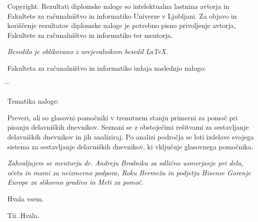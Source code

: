 \documentclass[a4paper, 12pt]{book}
\newcommand{\clearemptydoublepage}{\newpage{\pagestyle{empty}\cleardoublepage}}
\begin{document}
\noindent
{\sc Copyright}. 
Rezultati diplomske naloge so intelektualna lastnina avtorja in Fakultete za računalništvo in informatiko Univerze v Ljubljani.
Za objavo in koriščenje rezultatov diplomske naloge je potrebno pisno privoljenje avtorja, Fakultete za računalništvo in informatiko ter mentorja.

\begin{center}
\mbox{}\vfill
\emph{Besedilo je oblikovano z urejevalnikom besedil \LaTeX.}
\end{center}
\clearemptydoublepage

\thispagestyle{empty}
\vspace*{4cm}

\noindent
Fakulteta za računalništvo in informatiko izdaja naslednjo nalogo:
\medskip
\begin{tabbing}
\hspace{32mm}\= \hspace{6cm} \= \kill




Tematika naloge:
\end{tabbing}
Preveri, ali so glasovni pomočniki v trenutnem stanju primerni za pomoč pri pisanju delavniških dnevnikov.
Seznani se z obstoječimi rešitvami za sestavljanje delavniških dnevnikov in jih analiziraj.
Po analizi področja se loti izdelave svojega sistema za sestavljanje delavniških dnevnikov, ki vključuje glasovnega pomočnika.
\vspace{15mm}



\vspace{2cm}

\clearemptydoublepage

\thispagestyle{empty}\mbox{}\vfill\null\it%
\noindent
Zahvaljujem se mentorju dr. Andreju Brodniku za odlično usmerjanje pri delu, očetu in mami za neizmerno podporo, Roku Bermežu in podjetju Hisense Gorenje Europe za slikovno gradivo in Meti za pomoč.

Hvala vsem.
\rm\normalfont

\clearemptydoublepage

\thispagestyle{empty}\mbox{}{\textheight}\mbox{}\hfill\begin{minipage}{0.55\textwidth}%
	Tii. Hvala.
\normalfont\end{minipage}
\end{document}
